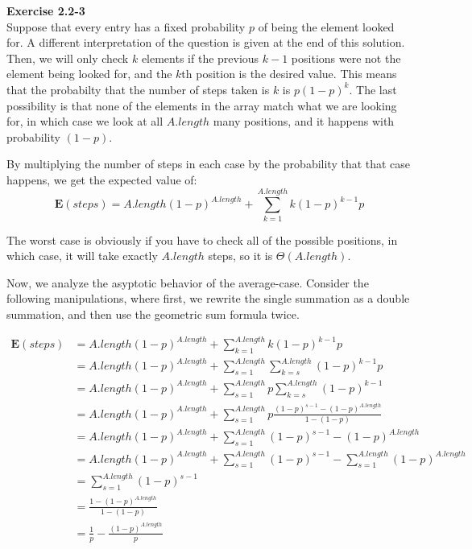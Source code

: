 \documentclass{article}
\begin{document}
\noindent\textbf{ Exercise 2.2-3}\\

Suppose that every entry has a fixed probability $p$ of being the element looked for. A different interpretation of the question is given at the end of this solution. Then, we will only check $k$ elements if the previous $k-1$ positions were not the element being looked for, and the $k$th position is the desired value. This means that the probabilty that the number of steps taken is $k$ is $p(1-p)^k$. The last possibility is that none of the elements in the array match what we are looking for, in which case we look at all $A.length$ many positions, and it happens with probability $(1-p)$.

By multiplying the number of steps in each case by the probability that that case happens, we get the expected value of:
\[
\mathbf{E}(steps) = A.length(1-p)^{A.length} + \sum_{k=1}^{A.length} k(1-p)^{k-1}p
\]

The worst case is obviously if you have to check all of the possible positions, in which case, it will take exactly $A.length$ steps, so it is $\Theta(A.length)$.

Now, we analyze the asyptotic behavior of the average-case. Consider the following manipulations, where first, we rewrite the single summation as a double summation, and then use the geometric sum formula twice.

\begin{align*}
\mathbf{E}(steps) &= A.length(1-p)^{A.length} + \sum_{k=1}^{A.length} k(1-p)^{k-1}p\\
&= A.length(1-p)^{A.length} + \sum_{s=1}^{A.length} \sum_{k=s}^{A.length} (1-p)^{k-1} p\\
&= A.length(1-p)^{A.length} + \sum_{s=1}^{A.length} p \sum_{k=s}^{A.length} (1-p)^{k-1} \\
&= A.length(1-p)^{A.length} + \sum_{s=1}^{A.length} p \frac{(1-p)^{s-1} - (1-p)^{A.length}}{1-(1-p)} \\
&= A.length(1-p)^{A.length} + \sum_{s=1}^{A.length} (1-p)^{s-1} - (1-p)^{A.length} \\
&= A.length(1-p)^{A.length} + \sum_{s=1}^{A.length} (1-p)^{s-1} - \sum_{s=1}^{A.length}(1-p)^{A.length} \\
&= \sum_{s=1}^{A.length} (1-p)^{s-1} \\
&= \frac{1 - (1-p)^{A.length}}{1-(1-p)} \\
&= \frac{1}{p} - \frac{(1-p)^{A.length}}{p}\\
\end{align*}
\end{document}
